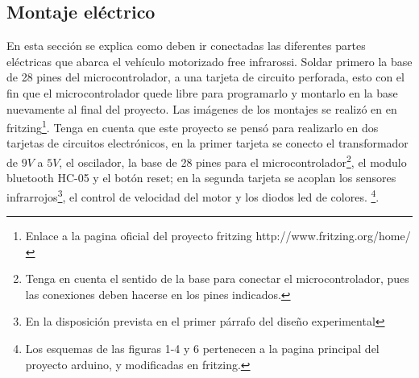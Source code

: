 \documentclass[12]{article}
\begin{document}
\begin{multicols}{2}
\subsection{Montaje eléctrico}
En esta sección se explica como deben ir conectadas las diferentes partes eléctricas que  abarca el vehículo motorizado free infrarossi. Soldar primero la base de 28 pines del microcontrolador, a una tarjeta de circuito perforada, esto con el fin que el microcontrolador quede libre para programarlo y montarlo en la base nuevamente al final del proyecto. Las imágenes de los montajes se realizó en en fritzing\footnote{Enlace a la pagina oficial del proyecto fritzing http://www.fritzing.org/home/}. Tenga en cuenta que este proyecto se pensó para realizarlo en dos tarjetas de circuitos electrónicos, en la primer tarjeta se conecto el transformador de $9 V$ a   $5 V$, el oscilador, la base de 28 pines para el microcontrolador\footnote{Tenga en cuenta el sentido de la base para conectar el microcontrolador, pues las conexiones deben hacerse en los pines indicados.}, el modulo bluetooth HC-05 y el botón reset; en la segunda tarjeta se acoplan los sensores infrarrojos\footnote{En la disposición prevista en el primer párrafo del diseño experimental}, el control de velocidad del motor y los diodos led de colores. \footnote{Los esquemas de las figuras  1-4 y 6 pertenecen a la pagina principal del proyecto arduino\cite{ARDUINO}, y modificadas en fritzing\cite{FRITZING}.}.

\end{multicols}
\end{document}
